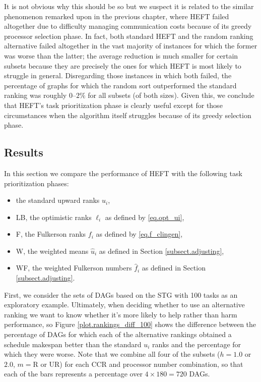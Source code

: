 \documentclass[12pt]{article}
\begin{document}
It is not obvious why this should be so but we suspect it is related to the similar phenomenon remarked upon in the previous chapter, where HEFT failed altogether due to difficulty managing communication costs because of its greedy processor selection phase. In fact, both standard HEFT and the random ranking alternative failed altogether in the vast majority of instances for which the former was worse than the latter; the average reduction is much smaller for certain subsets because they are precisely the ones for which HEFT is most likely to struggle in general. Disregarding those instances in which both failed, the percentage of graphs for which the random sort outperformed the standard ranking was roughly $0$--$2\%$ for all subsets (of both sizes). Given this, we conclude that HEFT's task prioritization phase is clearly useful except for those circumstances when the algorithm itself struggles because of its greedy selection phase. 


\subsection{Results}
\label{subsect.evaluation}

In this section we compare the performance of HEFT with the following task prioritization phases:
\begin{itemize}
	\item the standard upward ranks $u_i$,
	\item LB, the optimistic ranks $\ell_i$ as defined by \eqref{eq.opt_ui},
	\item F, the Fulkerson ranks $f_i$ as defined by \eqref{eq.f_clingen},
	\item W, the weighted means $\hat{u}_i$ as defined in Section \ref{subsect.adjusting},
	\item WF, the weighted Fulkerson numbers $\hat{f}_i$ as defined in Section \ref{subsect.adjusting}.
\end{itemize}
First, we consider the sets of DAGs based on the STG with 100 tasks as an exploratory example. Ultimately, when deciding whether to use an alternative ranking we want to know whether it's more likely to help rather than harm performance, so Figure \ref{plot.rankings_diff_100} shows the difference between the percentage of DAGs for which each of the alternative rankings obtained a schedule makespan better than the standard $u_i$ ranks and the percentage for which they were worse. Note that we combine all four of the subsets ($h = 1.0$ or $2.0$, $m = \text{R}$ or UR) for each CCR and processor number combination, so that each of the bars represents a percentage over $4 \times 180 = 720$ DAGs. 
\end{document}
